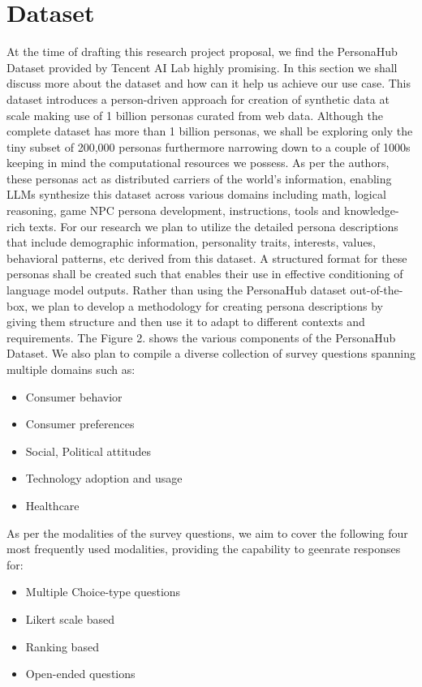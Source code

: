 \documentclass[11pt]{article}
\begin{document}
\section{Dataset}

At the time of drafting this research project proposal, we find the PersonaHub Dataset provided by Tencent AI Lab \citep{ge2024scalingsyntheticdatacreation} highly promising. In this section we shall discuss more about the dataset and how can it help us achieve our use case. This dataset introduces a person-driven approach for creation of synthetic data at scale making use of 1 billion personas curated from web data. Although the complete dataset has more than 1 billion personas, we shall be exploring only the tiny subset of 200,000 personas furthermore narrowing down to a couple of 1000s keeping in mind the computational resources we possess. As per the authors, these personas act as distributed carriers of the world's information, enabling LLMs synthesize this dataset across various domains including math, logical reasoning, game NPC persona development, instructions, tools and knowledge-rich texts.
For our research we plan to utilize the detailed persona descriptions that include demographic information, personality traits, interests, values, behavioral patterns, etc derived from this dataset. A structured format for these personas shall be created such that enables their use in effective conditioning of language model outputs. Rather than using the PersonaHub dataset out-of-the-box, we plan to develop a methodology for creating persona descriptions by giving them structure and then use it to adapt to different contexts and requirements.
The Figure 2. shows the various components of the PersonaHub Dataset.
We also plan to compile a diverse collection of survey questions spanning multiple domains such as:
\begin{itemize}
    \item Consumer behavior
    \item Consumer preferences
    \item Social, Political attitudes
    \item Technology adoption and usage
    \item Healthcare
\end{itemize}
As per the modalities of the survey questions, we aim to cover the following four most frequently used modalities, providing the capability to geenrate responses for:
\begin{itemize}
    \item Multiple Choice-type questions
    \item Likert scale based
    \item Ranking based
    \item Open-ended questions
\end{itemize}
\end{document}
